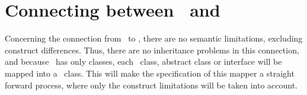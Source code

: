 \section{Connecting between \jml\ and \vpp}
\label{chapter2:sec:jmltovpp}

Concerning the connection from \jml\ to \vpp, there are no semantic limitations, excluding construct differences. Thus, there are no inheritance problems in this connection, and because \vpp\ has only classes, each \jml\ class, abstract class or interface will be mapped into a \vpp\ class. This will make the specification of this mapper a straight forward process, where only the construct limitations will be taken into account.


